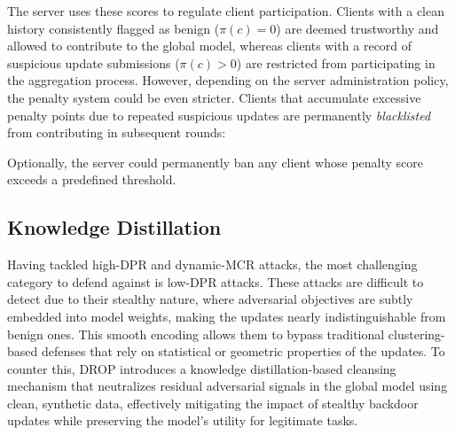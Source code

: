 The server uses these scores to regulate client participation. Clients with a clean history \ie consistently flagged as benign (\(\pi(c) = 0\)) are deemed trustworthy and allowed to contribute to the global model, whereas clients with a record of suspicious update submissions (\(\pi(c) > 0\)) are restricted from participating in the aggregation process. However, depending on the server administration policy, the penalty system could be even stricter. Clients that accumulate excessive penalty points due to repeated suspicious updates are permanently \textit{blacklisted} from contributing in subsequent rounds:
\begin{comment}
\newline
\newline
\underline{\textbf{Rule 2}}: \textbf{\textit{(Optional)}} Specifically, the server permanently bans any client whose penalty score exceeds a predefined threshold \( \tau \):
\begin{equation}
    \pi(c) \geq \tau \implies \text{ban}(c).
\end{equation}
\georgios{Another option would be to rename Rule 2 to shortsection “Calculating Penalty/Trust Scores” and omit the rule formulation but still keep the text around it}
\end{comment}
Optionally, the server could permanently ban any client whose penalty score exceeds a predefined threshold.
\label{goal2}



\subsection{Knowledge Distillation}
\label{subsec:kd}

Having tackled high-DPR and dynamic-MCR attacks, the most challenging category to defend against is low-DPR attacks.
These attacks are difficult to detect due to their stealthy nature, where adversarial objectives are subtly embedded into model weights, making the updates nearly indistinguishable from benign ones. This smooth encoding allows them to bypass traditional clustering-based defenses that rely on statistical or geometric properties of the updates. To counter this, DROP introduces a knowledge distillation-based cleansing mechanism that neutralizes residual adversarial signals in the global model using clean, synthetic data, effectively mitigating the impact of stealthy backdoor updates while preserving the model’s utility for legitimate tasks.

